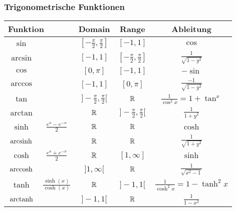 \subsubsection{Trigonometrische Funktionen}
\begin{tabular}{c | c | c | c | c}
    \multicolumn{2}{l|}{Funktion} & Domain                      & Range                             & Ableitung\\\hline
    $\sin$                        &                             & $[-\frac{\pi}{2}, \frac{\pi}{2}]$ & $[-1, 1]$                          & $\cos$\\\hline
    $\arcsin$                     &                             & $[-1, 1]$                         & $[-\frac{\pi}{2}, \frac{\pi}{2}]$  & $\frac{1}{\sqrt{1-y^2} }$\\\hline
    $\cos$                        &                             & $[0, \pi]$                        & $[-1, 1]$                          & $-\sin$\\\hline
    $\arccos$                     &                             & $[-1, 1]$                         & $[0, \pi]$                         & $\frac{-1}{\sqrt{1-y^2} }$\\\hline
    $\tan$                        &                             & $]-\frac{\pi}{2}, \frac{\pi}{2}[$ & $ \mathbb{R}$                              & $\frac{1}{\cos^2x} = 1 + \tan^x$\\\hline
    $\arctan$                     &                             & $ \mathbb{R}$                             & $]- \frac{\pi}{2}, \frac{\pi}{2}[$ & $\frac{1}{1+y^2}$\\\hline
    $\sinh$                       & $\frac{e^x - e^{-x}}{2}$    & $\mathbb{R}$                              & $\mathbb{R}$                               & $\cosh$\\\hline
    $\operatorname{arcsinh}$                    &                             & $\mathbb{R}$                              & $\mathbb{R}$                               & $\frac{1}{\sqrt{1+y^2} }$\\\hline
    $\cosh$                       & $\frac{e^x+e^{-x}}{2}$      & $\mathbb{R}$                              & $[1,\infty]$                       & $\sinh$\\\hline
    $\operatorname{arccosh}$                    &                             & $]1,\infty[$                      & $\mathbb{R}$                               & $\frac{1}{\sqrt{x^2-1}}$\\\hline
    $\tanh$                       & $\frac{\sinh(x)}{\cosh(x)}$ & $\mathbb{R}$                              & $]-1,1[$                           & $\frac{1}{\cosh^2x} = 1 - \tanh^2x$\\\hline
    $\operatorname{arctanh}$                    &                             & $]-1, 1[$                         & $\mathbb{R}$                               & $\frac{1}{1-x^2}$\\\hline
\end{tabular}

